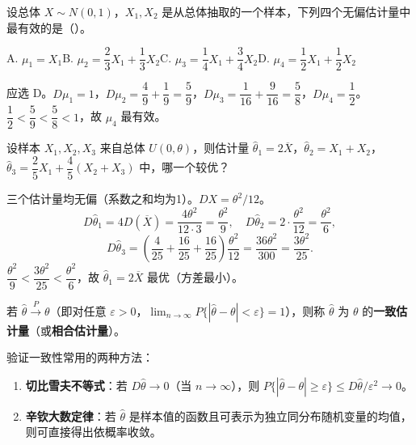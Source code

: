 \documentclass[lang=cn,11pt]{elegantbook}
\begin{document}
\begin{exercise}\label{exer:7-eff-N01}
设总体 \(X \sim N(0,1)\)，\(X_1, X_2\) 是从总体抽取的一个样本，下列四个无偏估计量中最有效的是（\quad）。\par
A. \(\mu_1 = X_1\)\qquad B. \(\mu_2 = \dfrac{2}{3}X_1+\dfrac{1}{3}X_2\)\qquad C. \(\mu_3 = \dfrac{1}{4}X_1+\dfrac{3}{4}X_2\)\qquad D. \(\mu_4 = \dfrac{1}{2}X_1+\dfrac{1}{2}X_2\)
\end{exercise}
\begin{solution}
应选 D。\(D\mu_1 = 1\)，\(D\mu_2 = \dfrac{4}{9}+\dfrac{1}{9} = \dfrac{5}{9}\)，\(D\mu_3 = \dfrac{1}{16}+\dfrac{9}{16} = \dfrac{5}{8}\)，\(D\mu_4 = \dfrac{1}{2}\)。\\
\(\dfrac{1}{2} < \dfrac{5}{9} < \dfrac{5}{8} < 1\)，故 \(\mu_4\) 最有效。
\end{solution}


\begin{exercise}\label{exer:7-u0-compare}
设样本 \(X_1, X_2, X_3\) 来自总体 \(U(0,\theta)\)，则估计量 \(\hat{\theta}_1=2\overline{X}\)，\(\hat{\theta}_2=X_1+X_2\)，\(\hat{\theta}_3=\dfrac{2}{5}X_1+\dfrac{4}{5}(X_2+X_3)\) 中，哪一个较优？
\end{exercise}
\begin{solution}
三个估计量均无偏（系数之和均为1）。\(DX = \theta^2/12\)。
\[
D\hat{\theta}_1 = 4D(\overline{X}) = \frac{4\theta^2}{12\cdot3} = \frac{\theta^2}{9},
\quad
D\hat{\theta}_2 = 2\cdot\frac{\theta^2}{12} = \frac{\theta^2}{6},
\]
\[
D\hat{\theta}_3 = \left(\frac{4}{25}+\frac{16}{25}+\frac{16}{25}\right)\frac{\theta^2}{12} = \frac{36\theta^2}{300} = \frac{3\theta^2}{25}.
\]
\(\dfrac{\theta^2}{9} < \dfrac{3\theta^2}{25} < \dfrac{\theta^2}{6}\)，故 \(\hat{\theta}_1 = 2\overline{X}\) 最优（方差最小）。
\end{solution}



\begin{definition} \label{def:consistent}
若 \(\hat{\theta}\xrightarrow{P}\theta\)（即对任意 \(\varepsilon > 0\)，\(\lim_{n\to\infty}P\{|\hat{\theta}-\theta| < \varepsilon\} = 1\)），则称 \(\hat{\theta}\) 为 \(\theta\) 的\textbf{一致估计量}（或\textbf{相合估计量}）。
\end{definition}

\begin{note}
验证一致性常用的两种方法：
\begin{enumerate}
    \item \textbf{切比雪夫不等式}：若 \(D\hat{\theta} \to 0\)（当 \(n\to\infty\)），则 \(P\{|\hat{\theta}-\theta| \geq \varepsilon\} \leq D\hat{\theta}/\varepsilon^2 \to 0\)。
    \item \textbf{辛钦大数定律}：若 \(\hat{\theta}\) 是样本值的函数且可表示为独立同分布随机变量的均值，则可直接得出依概率收敛。
\end{enumerate}
\end{note}
\end{document}
